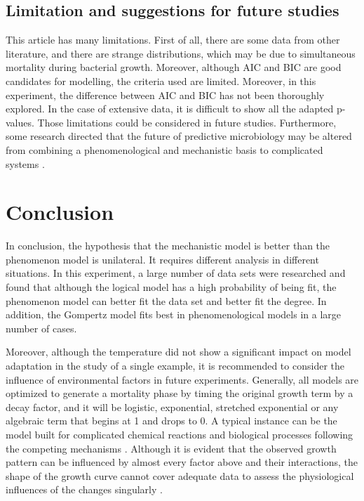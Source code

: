 \documentclass[11pt]{article}
\begin{document}
\subsection{Limitation and suggestions for future studies}
This article has many limitations. First of all, there are some data from other literature, and there are strange distributions, which may be due to simultaneous mortality during bacterial growth. Moreover, although AIC and BIC are good candidates for modelling, the criteria used are limited. Moreover, in this experiment, the difference between AIC and BIC has not been thoroughly explored. In the case of extensive data, it is difficult to show all the adapted p-values. Those limitations could be considered in future studies. Furthermore, some research directed that the future of predictive microbiology may be altered from combining a phenomenological and mechanistic basis to complicated systems \citep{R5}. 


\section{Conclusion}
In conclusion, the hypothesis that the mechanistic model is better than the phenomenon model is unilateral. It requires different analysis in different situations. In this experiment, a large number of data sets were researched and found that although the logical model has a high probability of being fit, the phenomenon model can better fit the data set and better fit the degree. In addition, the Gompertz model fits best in phenomenological models in a large number of cases. 

Moreover, although the temperature did not show a significant impact on model adaptation in the study of a single example, it is recommended to consider the influence of environmental factors in future experiments. Generally, all models are optimized to generate a mortality phase by timing the original growth term by a decay factor, and it will be logistic, exponential, stretched exponential or any algebraic term that begins at 1 and drops to 0. A typical instance can be the model built for complicated chemical reactions and biological processes following the competing mechanisms \citep{R30}. Although it is evident that the observed growth pattern can be influenced by almost every factor above and their interactions, the shape of the growth curve cannot cover adequate data to assess the physiological influences of the changes singularly \citep{R29}.


\newpage


\end{document}
